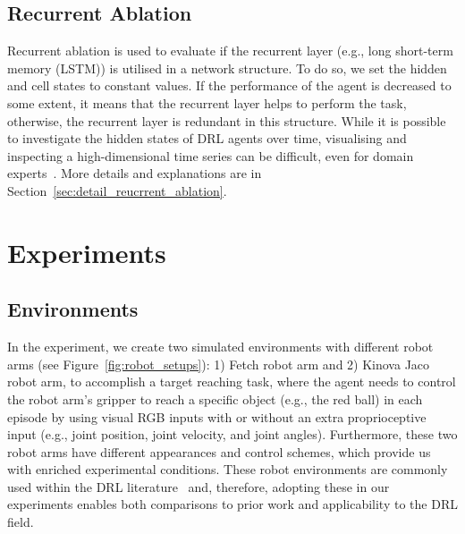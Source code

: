 \subsection{Recurrent Ablation}
Recurrent ablation is used to evaluate if the recurrent layer (e.g., long short-term memory (LSTM)) is utilised in a network structure. To do so, we set the hidden and cell states to constant values. If the performance of the agent is decreased to some extent, it means that the recurrent layer helps to perform the task, otherwise, the recurrent layer is redundant in this structure. While it is possible to investigate the hidden states of DRL agents over time, visualising and inspecting a high-dimensional time series can be difficult, even for domain experts~\cite{jaunet2020drlviz}. More details and explanations are in Section~\ref{sec:detail_reucrrent_ablation}.

\section{Experiments}
\label{ch6:exp}
\subsection{Environments}
In the experiment, we create two simulated environments with different robot arms (see Figure~\ref{fig:robot_setups}): 1) Fetch robot arm and 2) Kinova Jaco robot arm, to accomplish a target reaching task, where the agent needs to control the robot arm's gripper to reach a specific object (e.g., the red ball) in each episode by using visual RGB inputs with or without an extra proprioceptive input (e.g., joint position, joint velocity, and joint angles). Furthermore, these two robot arms have different appearances and control schemes, which provide us with enriched experimental conditions.
These robot environments are commonly used within the DRL literature~\cite{andrychowicz2017hindsight, gu2017deep, rusu2017sim} and, therefore, adopting these in our experiments enables both comparisons to prior work and applicability to the DRL field.

